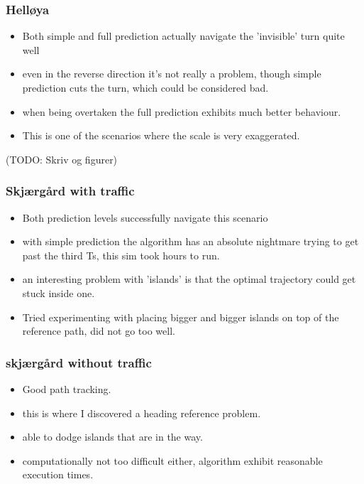 \subsubsection{Helløya}
\begin{itemize}
    \item Both simple and full prediction actually navigate the 'invisible' turn quite well
    \item even in the reverse direction it's not really a problem, though simple prediction cuts the turn, which could be considered bad.
    \item when being overtaken the full prediction exhibits much better behaviour.
    \item This is one of the scenarios where the scale is very exaggerated.
\end{itemize}
(TODO: Skriv og figurer)

\subsubsection{Skjærgård with traffic}
\begin{itemize}

    \item Both prediction levels successfully navigate this scenario
    \item with simple prediction the algorithm has an absolute nightmare trying to get past the third \gls{Ts}, this sim took hours to run.
    \item an interesting problem with 'islands' is that the optimal trajectory could get stuck inside one.
    \item Tried experimenting with placing bigger and bigger islands on top of the reference path, did not go too well.
\end{itemize}

\subsubsection{skjærgård without traffic}
\begin{itemize}
    \item Good path tracking.
    \item this is where I discovered a heading reference problem.
    \item able to dodge islands that are in the way.
    \item computationally not too difficult either, algorithm exhibit reasonable execution times.
\end{itemize}


